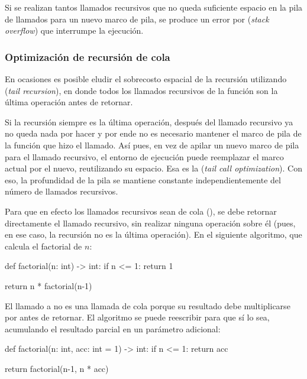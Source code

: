 Si se realizan tantos llamados recursivos que no queda suficiente espacio en la pila de llamados para un nuevo marco de pila, se produce un error por  (\textit{stack overflow}) que interrumpe la ejecución.

\subsubsection{Optimización de recursión de cola}
\label{sec:optimizacion_recursion_cola}

En ocasiones es posible eludir el sobrecosto espacial de la recursión utilizando  (\textit{tail recursion}), en donde todos los llamados recursivos de la función son la última operación antes de retornar.

Si la recursión siempre es la última operación, después del llamado recursivo ya no queda nada por hacer y por ende no es necesario mantener el marco de pila de la función que hizo el llamado. Así pues, en vez de apilar un nuevo marco de pila para el llamado recursivo, el entorno de ejecución puede reemplazar el marco actual por el nuevo, reutilizando su espacio. Esa es la  (\textit{tail call optimization}). Con eso, la profundidad de la pila se mantiene constante independientemente del número de llamados recursivos.

Para que en efecto los llamados recursivos sean de cola (), se debe retornar directamente el llamado recursivo, sin realizar ninguna operación sobre él (pues, en ese caso, la recursión no es la última operación). En el siguiente algoritmo, que calcula el factorial de \(n\):
\begin{codeblock}
\begin{pseudocode}
def factorial(n: int) -> int:
    if n <= 1: return 1

    return n * factorial(n-1)
\end{pseudocode}
\end{codeblock}

El llamado a  no es una llamada de cola porque su resultado debe multiplicarse por  antes de retornar. El algoritmo se puede reescribir para que sí lo sea, acumulando el resultado parcial en un parámetro adicional:
\begin{codeblock}
\begin{pseudocode}
def factorial(n: int, acc: int = 1) -> int:
    if n <= 1: return acc

    return factorial(n-1, n * acc)
\end{pseudocode}
\end{codeblock}


